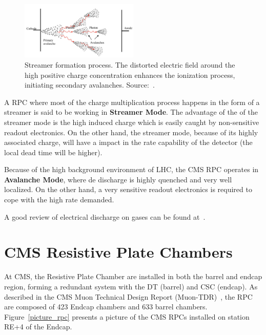 \begin{figure}[h]
    \begin{center}
    \includegraphics[width=0.5\textwidth,keepaspectratio]{figures/rpc/streamer.png}
    \end{center}
    \caption{Streamer formation process. The distorted electric field around the high positive charge concentration enhances the ionization process, initiating secondary avalanches. Source:~\cite{livro_descarga}.}
    \label{streamer}
\end{figure}

A RPC where most of the charge multiplication process happens in the form of a streamer is said to be working in \textbf{Streamer Mode}. The advantage of the of the streamer mode is the high induced charge which is easily caught by non-sensitive readout electronics. On the other hand, the streamer mode, because of its highly associated charge, will have a impact in the rate capability of the detector (the local dead time will be higher).

Because of the high background environment of LHC, the CMS RPC operates in \textbf{Avalanche Mode}, where de discharge is highly quenched and very well localized. On the other hand, a very sensitive readout electronics is required to cope with the high rate demanded.

A good review of electrical discharge on gases can be found at~\cite{livro_descarga}.

\section{CMS Resistive Plate Chambers}

At CMS, the Resistive Plate Chamber are installed in both the barrel and endcap region, forming a redundant system with the DT (barrel) and CSC (endcap). As described in the CMS Muon Technical Design Report (Muon-TDR)~\cite{muon_tdr}, the RPC are composed of 423 Endcap chambers and 633 barrel chambers. Figure~\ref{picture_rpc} presents a picture of the CMS RPCs installed on station RE+4 of the Endcap.

